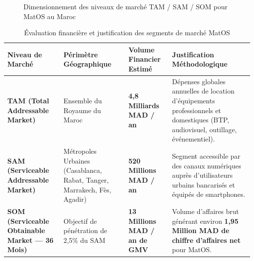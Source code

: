 \documentclass[11pt,a4paper]{report}
\begin{document}
\begin{figure}[h!]
\centering
{}
\caption{Dimensionnement des niveaux de marché TAM / SAM / SOM pour MatOS au Maroc}
\end{figure}

\begin{table}[h!]
\centering
\small
\begin{tabularx}{\textwidth}{l p{3.2cm} p{3.8cm} X}
\toprule
\textbf{Niveau de Marché} & \textbf{Périmètre Géographique} & \textbf{Volume Financier Estimé} & \textbf{Justification Méthodologique} \\
\midrule
\textbf{TAM (Total Addressable Market)} & Ensemble du Royaume du Maroc & \textbf{4,8 Milliards MAD / an} & Dépenses globales annuelles de location d'équipements professionnels et domestiques (BTP, audiovisuel, outillage, événementiel). \\
\addlinespace
\textbf{SAM (Serviceable Addressable Market)} & Métropoles Urbaines (Casablanca, Rabat, Tanger, Marrakech, Fès, Agadir) & \textbf{520 Millions MAD / an} & Segment accessible par des canaux numériques auprès d'utilisateurs urbains bancarisés et équipés de smartphones. \\
\addlinespace
\textbf{SOM (Serviceable Obtainable Market --- 36 Mois)} & Objectif de pénétration de 2,5\% du SAM & \textbf{13 Millions MAD / an de GMV} & Volume d'affaires brut générant environ \textbf{1,95 Million MAD de chiffre d'affaires net} pour MatOS. \\
\bottomrule
\end{tabularx}
\caption{Évaluation financière et justification des segments de marché MatOS}
\end{table}
\end{document}
